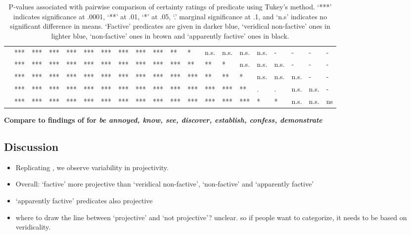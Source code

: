 \documentclass[11pt,fleqn]{article}
\newcommand{\6}{\mbox{$[\hspace*{-.6mm}[$}}
\newcommand{\9}{\mbox{$]\hspace*{-.6mm}]$}}
\begin{document}
\begin{table}[H]
\begin{tabular}{l l l l l l l l l l l l l l l l l l l l }
\color{brown}{\em hear}\color{black}		& *** & *** & *** & *** & *** & *** & *** & *** & *** & ** & * & n.s. & n.s. & n.s. & n.s. & - & - & - & - \\
\color{blue}{\em see}\color{black}			& *** & *** & *** & *** & *** & *** & *** & *** & *** & *** & ** & ** & * & n.s. & n.s. & n.s. & - & - & - \\
\color{black}{\em inform}\color{black}			& *** & *** & *** & *** & *** & *** & *** & *** & *** & *** & *** & ** & ** & * & n.s. & n.s. & n.s. & - & - \\
\color{blue}{\em know}\color{black}			& *** & *** & *** & *** & *** & *** & *** & *** & *** & *** & *** & *** & *** & ** & . & . & n.s. & n.s. & -  \\
\color{blue}{\em be annoyed}\color{black}		& *** & *** & *** & *** & *** & *** & *** & *** & ***  & ***  & *** & *** & *** & *** & * & * & n.s. & n.s. & ns  \\

\bottomrule
\end{tabular}
\caption{P-values associated with pairwise comparison of certainty ratings of predicate using Tukey's method. `***' indicates significance at .0001, `**' at .01, `*' at .05, `.' marginal significance at .1, and `n.s' indicates no significant difference in means. `Factive' predicates are given in darker blue, `veridical non-factive' ones in lighter blue, `non-factive' ones in brown and `apparently factive' ones in black.}\label{t-pairwise-proj}
\end{table}

{\bf Compare to findings of \citealt{tbd-variability} for {\em be annoyed, know, see, discover, establish, confess, demonstrate}}

\subsection{Discussion}

\begin{itemize}

\item Replicating \citealt{tbd-variability}, we observe variability in projectivity.

\item Overall: `factive' more projective than `veridical non-factive', `non-factive' and `apparently factive' 

\item `apparently factive' predicates also projective

\item where to draw the line between `projective' and `not projective'? unclear. so if people want to categorize, it needs to be based on veridicality.

\end{itemize}
\end{document}
